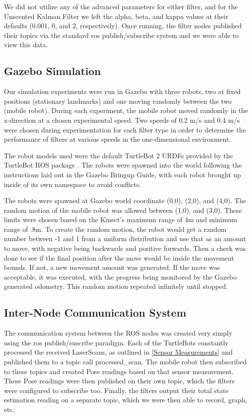\documentclass[conference]{IEEEtran}
\begin{document}
We did not utilize any of the advanced parameters for either filter, and for the Unscented Kalman Filter we left the 
alpha, beta, and kappa values at their defaults (0.001, 0, and 2, respectively). Once running, the filter nodes 
published their topics via the standard ros publish/subscribe system and we were able to view this data.


\subsection{Gazebo Simulation}
Our simulation experiments were run in Gazebo with three robots, two at fixed positions (stationary landmarks) and one 
moving randomly between the two (mobile robot). During each experiment, the mobile robot moved randomly in the 
x-direction at a chosen experimental speed. Two speeds of 0.2 m/s and 0.4 m/s were chosen during experimentation for 
each filter type in order to determine the performance of filters at various speeds in the one-dimensional environment.

The robot models used were the default TurtleBot 2 URDFs provided by the TurtleBot ROS package \cite{turtlebot}. The 
robots were spawned into the world following the instructions laid out in the Gazebo Bringup Guide, with each robot 
brought up inside of its own namespace to avoid conflicts.

The robots were spawned at Gazebo world coordinate (0,0), (2,0), and (4,0). The random motion of the mobile robot was 
allowed between (1,0), and (3,0). These limits were chosen based on the Kinect's maximum range of 4m and minimum range 
of .8m. To create the random motion, the robot would get a random number between -1 and 1 from a uniform distribution 
and use that as an amount to move, with negative being backwards and positive forwards. Then a check was done to see if 
the final position after the move would be inside the movement bounds. If not, a new movement amount was generated. If 
the move was acceptable, it was executed, with the progress being monitored by the Gazebo generated odometry. This 
random motion repeated infinitely until stopped.

\subsection{Inter-Node Communication System}
The communication system between the ROS nodes was created very simply using the ros publish/suscribe paradigm. Each of 
the TurtleBots constantly processed the received LaserScans, as outlined in \ref{Sensor Measurements} and published 
them to a topic call processed\_scan. The mobile robot then subscribed to these topics and created Pose readings based 
on that sensor measurement. These Pose readings were then published on their own topic, which the filters were 
configured to subscribe too. Finally, the filters output their total state estimation reading on a separate topic, 
which we were then able to record, graph, etc.
\end{document}
